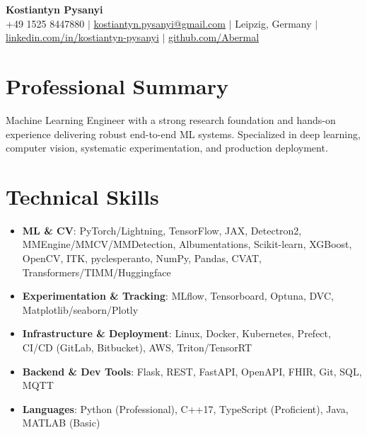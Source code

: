 \documentclass[letterpaper,10pt]{article}
\newcommand{\resumeItem}[1]{
    \item\small{#1}\vspace{-0.5pt}
}
\newcommand{\resumeSubHeadingList}{\begin{itemize}[leftmargin=0.15in, label={}]\vspace{-2pt}}
\newcommand{\resumeSubHeadingListEnd}{\end{itemize}}
\begin{document}
\begin{center}
  \textbf{\Huge Kostiantyn Pysanyi}\vspace{4pt} \\
  \small +49 1525 8447880 $|$ \href{mailto:kostiantyn.pysanyi@gmail.com}{kostiantyn.pysanyi@gmail.com} $|$ Leipzig, Germany $|$
  \href{https://www.linkedin.com/in/kostiantyn-pysanyi/}{linkedin.com/in/kostiantyn-pysanyi} $|$ \href{https://github.com/Abermal}{github.com/Abermal}
\end{center}



\section{Professional Summary}
Machine Learning Engineer with a strong research foundation and hands-on experience delivering robust end-to-end ML systems. Specialized in deep learning, computer vision, systematic experimentation, and production deployment.

\section{Technical Skills}
\resumeSubHeadingList
  \resumeItem{\textbf{ML \& CV}: PyTorch/Lightning, TensorFlow, JAX, Detectron2, MMEngine/MMCV/MMDetection, Albumentations, Scikit-learn, XGBoost, OpenCV, ITK, pyclesperanto, NumPy, Pandas, CVAT, Transformers/TIMM/Huggingface}
  \resumeItem{\textbf{Experimentation \& Tracking}: MLflow, Tensorboard, Optuna, DVC, Matplotlib/seaborn/Plotly}
  \resumeItem{\textbf{Infrastructure \& Deployment}: Linux, Docker, Kubernetes, Prefect, CI/CD (GitLab, Bitbucket), AWS, Triton/TensorRT}
  \resumeItem{\textbf{Backend \& Dev Tools}: Flask, REST, FastAPI, OpenAPI, FHIR, Git, SQL, MQTT}
  \resumeItem{\textbf{Languages}: Python (Professional), C++17, TypeScript (Proficient), Java, MATLAB (Basic)}
\resumeSubHeadingListEnd
\end{document}
